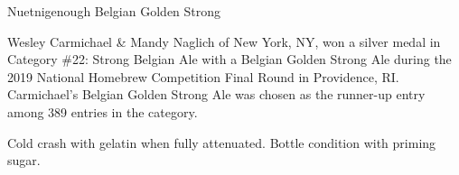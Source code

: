 \stylesection{\stylebelgiangoldenstrongale}

\begin{recipie}{Nuetnigenough Belgian Golden Strong}

\begin{aboutblock}
Wesley Carmichael \& Mandy Naglich of New York, NY, won a silver medal in
Category \#22: Strong Belgian Ale with a Belgian Golden Strong Ale during the
2019 National Homebrew Competition Final Round in Providence, RI. Carmichael's
Belgian Golden Strong Ale was chosen as the runner-up entry among 389 entries
in the category. \sourceaha
\end{aboutblock}


\begin{methodandtiming}
 
\begin{mashsteps}
\end{mashsteps}

\begin{fermentationsteps}
\end{fermentationsteps}

\begin{directions}
Cold crash with gelatin when fully attenuated. Bottle condition with priming
sugar.
\end{directions}

\end{methodandtiming}

\pagebreak

\begin{ingredientsblock}

\begin{malts}
\end{malts}

\begin{hops}
\end{hops}


\end{ingredientsblock}

\end{recipie}
